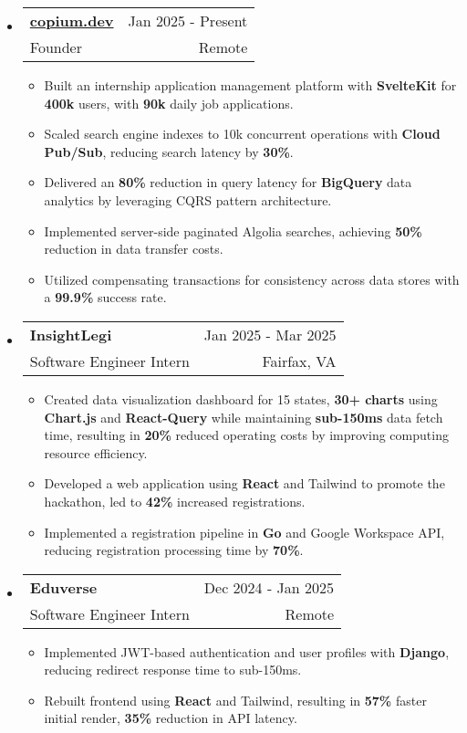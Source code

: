 \documentclass[letterpaper,11pt]{article}
\makeatletter
\newcommand{\resumeItem}[1]{
  \item{
    {#1}
  }
}
\newcommand{\resumeSubheading}[4]{
    \item
    \begin{tabular*}{0.985\textwidth}[t]{l@{\extracolsep{\fill}}r@{\hspace{-0.1in}}}
        {\textbf{#1}} & {#2} \\
        #3 &  #4 \\
    \end{tabular*}\vspace{-5pt}
}
\newcommand{\resumeSubHeadingListStart}{\begin{itemize}[leftmargin=0.00in, rightmargin=-0.2in, label={}]\vspace{3pt}}
\newcommand{\resumeSubHeadingListEnd}{\end{itemize}\vspace{-5pt}}
\newcommand{\resumeItemListStart}{\vspace{3pt}\begin{itemize}[leftmargin=0.15in, rightmargin=0.15in]}
\newcommand{\resumeItemListEnd}{\end{itemize}\vspace{-5pt}}
\makeatother
\begin{document}
\resumeSubHeadingListStart
\resumeSubheading
{\href{https://www.copium.dev}{copium.dev}} {Jan 2025 - Present}
{Founder} {Remote}
\resumeItemListStart 
\resumeItem{Built an internship application management platform with \textbf{SvelteKit} for \textbf{400k} users, with \textbf{90k} daily job applications.}
\resumeItem{Scaled search engine indexes to 10k concurrent operations with \textbf{Cloud Pub/Sub}, reducing search latency by \textbf{30\%}.}
\resumeItem{Delivered an \textbf{80\%} reduction in query latency for \textbf{BigQuery} data analytics by leveraging CQRS pattern architecture.}
\resumeItem{Implemented server-side paginated Algolia searches, achieving \textbf{50\%} reduction in data transfer costs.}
\resumeItem{Utilized compensating transactions for consistency across data stores with a \textbf{99.9\%} success rate.}
\resumeItemListEnd
\resumeSubHeadingListEnd

\resumeSubHeadingListStart
\resumeSubheading
{InsightLegi} {Jan 2025 - Mar 2025}
{Software Engineer Intern} {Fairfax, VA}
\resumeItemListStart 
\resumeItem{Created data visualization dashboard for 15 states, \textbf{30+ charts} using \textbf{Chart.js} and \textbf{React-Query} while maintaining \textbf{sub-150ms} data fetch time, resulting in \textbf{20\%} reduced operating costs by improving computing resource efficiency.}
\resumeItem{Developed a web application using \textbf{React} and Tailwind to promote the hackathon, led to \textbf{42\%} increased registrations.}
\resumeItem{Implemented a registration pipeline in \textbf{Go} and Google Workspace API, reducing registration processing time by \textbf{70\%}.}
\resumeItemListEnd
\resumeSubHeadingListEnd

\resumeSubHeadingListStart
\resumeSubheading
{Eduverse} {Dec 2024 - Jan 2025}
{Software Engineer Intern} {Remote}
\resumeItemListStart
\resumeItem{Implemented JWT-based authentication and user profiles with \textbf{Django}, reducing redirect response time to sub-150ms.}
\resumeItem{Rebuilt frontend using \textbf{React} and Tailwind, resulting in \textbf{57\%} faster initial render, \textbf{35\%} reduction in API latency.}
\resumeItemListEnd
\resumeSubHeadingListEnd

\end{document}

